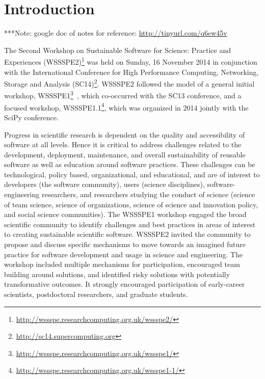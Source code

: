 \documentclass[11pt, oneside]{amsart}
\newcommand{\note}[1]{ {\textcolor{blueish}    { ***Note:      #1 }}}
\newcommand{\katznote}[1]{ {\textcolor{magenta}    { ***Dan:      #1 }}}
\newcommand{\gabnote}[1]{ {\textcolor{cyan}    { ***Gabrielle:     #1 }}}
\newcommand{\nchnote}[1]{  {\textcolor{orange}      { ***Neil: #1 }}}
\newcommand{\manishnote}[1]{  {\textcolor{violet}     { ***Manish: #1 }}}
\newcommand{\davidnote}[1]{  {\textcolor{darkgreen}      { ***David: #1 }}}
\begin{document}
\maketitle


\section{Introduction}

%
%
%
%


\note{google doc of notes for reference: \url{http://tinyurl.com/q6ew45v}}

The Second Workshop on Sustainable Software for Science: Practice and
Experiences
(WSSSPE2)\footnote{\url{http://wssspe.researchcomputing.org.uk/wssspe2/}} was
held on Sunday, 16 November 2014 in conjunction with the International
Conference for High Performance Computing, Networking, Storage and Analysis
(SC14)\footnote{\url{http://sc14.supercomputing.org}}. WSSSPE2 followed the
model of a general initial workshop,
WSSSPE1\footnote{\url{http://wssspe.researchcomputing.org.uk/wssspe1/}}~\cite{WSSSPE1-pre-report,WSSSPE1},
which co-occurred with the SC13 conference, and a focused workshop,
WSSSPE1.1\footnote{\url{http://wssspe.researchcomputing.org.uk/wssspe1-1/}},
which was organized in 2014 jointly with the SciPy conference.

Progress in scientific research is dependent on the quality and accessibility of
software at all levels. Hence it is critical to address challenges related to
the development, deployment, maintenance, and overall sustainability of reusable
software as well as education around software practices. These challenges can be
technological, policy based, organizational, and educational, and are of
interest to developers (the software community), users (science disciplines),
software-engineering researchers, and researchers studying the conduct of
science (science of team science, science of organizations, science of science
and innovation policy, and social science communities). The WSSSPE1 workshop
engaged the broad scientific community to identify challenges and best practices
in areas of interest to creating sustainable scientific software. WSSSPE2
invited the community to propose and discuss specific mechanisms to move towards
an imagined future practice for software development and usage in science and
engineering. The workshop included multiple mechanisms for participation,
encouraged team building around solutions, and identified risky solutions with
potentially transformative outcomes. It strongly encouraged participation of
early-career scientists, postdoctoral researchers, and graduate students.
\end{document}
